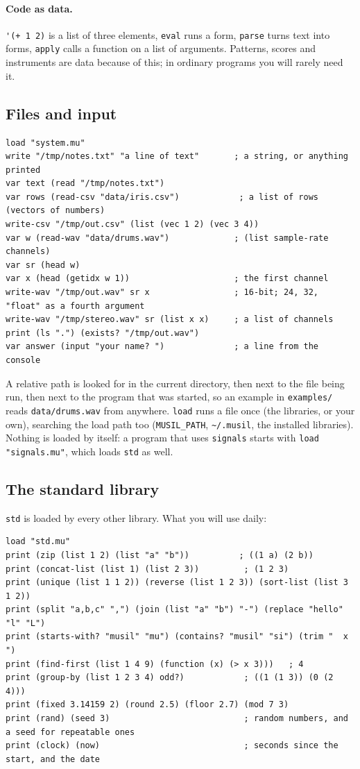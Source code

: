 \documentclass[11pt,a4paper]{article}
\newcommand{\musil}[1]{\lstinline[style=musilinline]{#1}}
\begin{document}
\paragraph{Code as data.} \musil{'(+ 1 2)} is a list of three elements, \musil{eval} runs a
form, \musil{parse} turns text into forms, \musil{apply} calls a function on a list of
arguments. Patterns, scores and instruments are data because of this; in ordinary programs
you will rarely need it.

\subsection{Files and input}

\begin{lstlisting}
load "system.mu"
write "/tmp/notes.txt" "a line of text"       ; a string, or anything printed
var text (read "/tmp/notes.txt")
var rows (read-csv "data/iris.csv")            ; a list of rows (vectors of numbers)
write-csv "/tmp/out.csv" (list (vec 1 2) (vec 3 4))
var w (read-wav "data/drums.wav")             ; (list sample-rate channels)
var sr (head w)
var x (head (getidx w 1))                     ; the first channel
write-wav "/tmp/out.wav" sr x                 ; 16-bit; 24, 32, "float" as a fourth argument
write-wav "/tmp/stereo.wav" sr (list x x)     ; a list of channels
print (ls ".") (exists? "/tmp/out.wav")
var answer (input "your name? ")              ; a line from the console
\end{lstlisting}

A relative path is looked for in the current directory, then next to the file being run,
then next to the program that was started, so an example in \texttt{examples/} reads
\texttt{data/drums.wav} from anywhere. \musil{load} runs a file once (the libraries, or your
own), searching the load path too (\texttt{MUSIL\_PATH}, \texttt{\textasciitilde/.musil},
the installed libraries). Nothing is loaded by itself: a program that uses \texttt{signals}
starts with \musil{load "signals.mu"}, which loads \texttt{std} as well.

\subsection{The standard library}

\texttt{std} is loaded by every other library. What you will use daily:

\begin{lstlisting}
load "std.mu"
print (zip (list 1 2) (list "a" "b"))          ; ((1 a) (2 b))
print (concat-list (list 1) (list 2 3))         ; (1 2 3)
print (unique (list 1 1 2)) (reverse (list 1 2 3)) (sort-list (list 3 1 2))
print (split "a,b,c" ",") (join (list "a" "b") "-") (replace "hello" "l" "L")
print (starts-with? "musil" "mu") (contains? "musil" "si") (trim "  x  ")
print (find-first (list 1 4 9) (function (x) (> x 3)))   ; 4
print (group-by (list 1 2 3 4) odd?)            ; ((1 (1 3)) (0 (2 4)))
print (fixed 3.14159 2) (round 2.5) (floor 2.7) (mod 7 3)
print (rand) (seed 3)                           ; random numbers, and a seed for repeatable ones
print (clock) (now)                             ; seconds since the start, and the date
\end{lstlisting}
\end{document}
